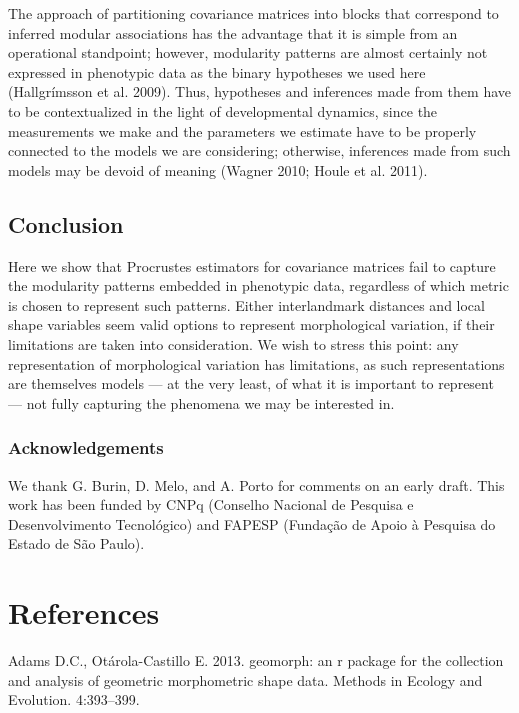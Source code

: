 \documentclass[12pt,]{article}
\begin{document}
The approach of partitioning covariance matrices into blocks that
correspond to inferred modular associations has the advantage that it is
simple from an operational standpoint; however, modularity patterns are
almost certainly not expressed in phenotypic data as the binary
hypotheses we used here (Hallgrímsson et al. 2009). Thus, hypotheses and
inferences made from them have to be contextualized in the light of
developmental dynamics, since the measurements we make and the
parameters we estimate have to be properly connected to the models we
are considering; otherwise, inferences made from such models may be
devoid of meaning (Wagner 2010; Houle et al. 2011).

\subsection{Conclusion}\label{conclusion}

Here we show that Procrustes estimators for covariance matrices fail to
capture the modularity patterns embedded in phenotypic data, regardless
of which metric is chosen to represent such patterns. Either
interlandmark distances and local shape variables seem valid options to
represent morphological variation, if their limitations are taken into
consideration. We wish to stress this point: any representation of
morphological variation has limitations, as such representations are
themselves models --- at the very least, of what it is important to
represent --- not fully capturing the phenomena we may be interested in.

\subsubsection{Acknowledgements}\label{acknowledgements}

We thank G. Burin, D. Melo, and A. Porto for comments on an early draft.
This work has been funded by CNPq (Conselho Nacional de Pesquisa e
Desenvolvimento Tecnológico) and FAPESP (Fundação de Apoio à Pesquisa do
Estado de São Paulo).

\section*{References}\label{references}

Adams D.C., Otárola-Castillo E. 2013. geomorph: an r package for the
collection and analysis of geometric morphometric shape data. Methods in
Ecology and Evolution. 4:393--399.
\end{document}
